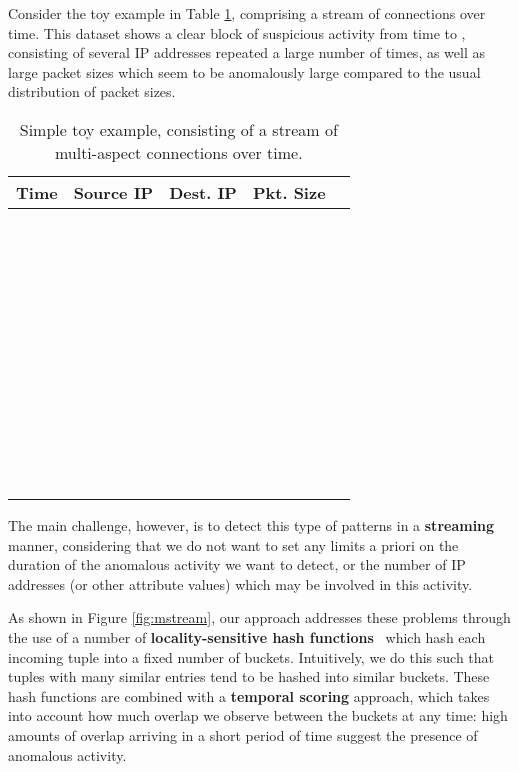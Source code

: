 \documentclass[sigconf]{acmart}
\begin{document}
Consider the toy example in Table \ref{tab:toy}, comprising a stream of connections over time. This dataset shows a clear block of suspicious activity from time  to , consisting of several IP addresses repeated a large number of times, as well as large packet sizes which seem to be anomalously large compared to the usual distribution of packet sizes.
\begin{table}[!htb]
\centering
\caption{Simple toy example, consisting of a stream of multi-aspect connections over time.}
\label{tab:toy}
\addtolength{\tabcolsep}{-2pt}
\begin{tabular}{@{}ccccc@{}}
\toprule
{\bf Time} & {\bf Source IP} & {\bf Dest. IP} & {\bf Pkt. Size} & {\bf } \\ \midrule
 & \ \ \  \ \ \ &  &  &  \\
 & \ \ \  \ \ \ &  &  &  \\
\textcolor{red}{} & \ \ \ \textcolor{red}{} \ \ \ & \textcolor{red}{} & \textcolor{red}{} & \textcolor{red}{} \\
\textcolor{red}{} & \ \ \ \textcolor{red}{} \ \ \ & \textcolor{red}{} & \textcolor{red}{} & \textcolor{red}{} \\
\textcolor{red}{} & \ \ \ \textcolor{red}{} \ \ \ & \textcolor{red}{} & \textcolor{red}{} & \textcolor{red}{} \\
\textcolor{red}{} & \ \ \ \textcolor{red}{} \ \ \ & \textcolor{red}{} & \textcolor{red}{} & \textcolor{red}{} \\
\textcolor{red}{} & \ \ \ \textcolor{red}{} \ \ \ & \textcolor{red}{} & \textcolor{red}{} & \textcolor{red}{} \\
\textcolor{red}{} & \ \ \ \textcolor{red}{} \ \ \ & \textcolor{red}{} & \textcolor{red}{} & \textcolor{red}{} \\
 & \ \ \  \ \ \ &  &  &  \\
 & \ \ \  \ \ \ &  &  &  \\
\bottomrule
\end{tabular}
\end{table}

The main challenge, however, is to detect this type of patterns in a {\bf streaming} manner, considering that we do not want to set any limits a priori on the duration of the anomalous activity we want to detect, or the number of IP addresses (or other attribute values) which may be involved in this activity.

As shown in Figure \ref{fig:mstream}, our approach addresses these problems through the use of a number of {\bf locality-sensitive hash functions}~\cite{charikar2002similarity}
which hash each incoming tuple into a fixed number of buckets. Intuitively, we do this such that tuples with many similar entries tend to be hashed into similar buckets. These hash functions are combined with a {\bf temporal scoring} approach, which takes into account how much overlap we observe between the buckets at any time: high amounts of overlap arriving in a short period of time suggest the presence of anomalous activity.
\end{document}
